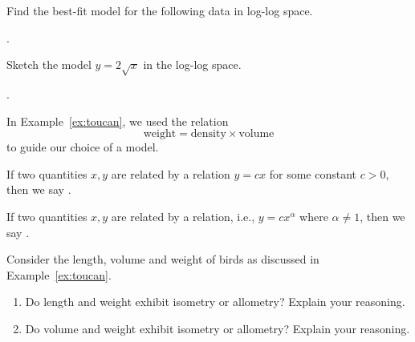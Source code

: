 \documentclass[../main.tex]{subfiles}
\begin{document}
\begin{example}
  Find the best-fit model for the following data in log-log space.

  .
\end{example}

\begin{example}
  Sketch the model \(y = 2 \sqrt{x}\) in the log-log space.
  
  .
\end{example}

\clearpage
In Example~\ref{ex:toucan}, we used the relation \[\text{weight} = \text{density} \times \text{volume} \] to guide our choice of a model. 

\begin{mdframed}[style=simple]
  If two quantities \(x,y\) are related by a  relation \(y = c x\) for some constant \(c > 0\), then we say .

  If two quantities \(x,y\) are related by a  relation, i.e., \(y = c x^{\alpha}\) where \(\alpha \ne 1\), then we say .
\end{mdframed}

\begin{example}
  Consider the length, volume and weight of birds as discussed in Example~\ref{ex:toucan}.

  \begin{enumerate}[wide]
    \item Do length and weight exhibit isometry or allometry? Explain your reasoning.

    \item Do volume and weight exhibit isometry or allometry? Explain your reasoning.
  \end{enumerate}
\end{example}
\end{document}
